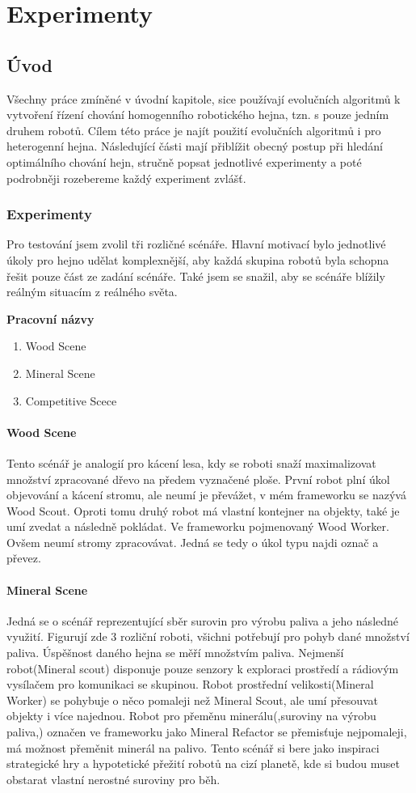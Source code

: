 \chapter{Experimenty}
\section{Úvod}
Všechny práce zmíněné v úvodní kapitole, sice používají evolučních algoritmů k vytvoření řízení chování homogenního robotického hejna, tzn. s pouze jedním druhem robotů. Cílem této práce je najít použití evolučních algoritmů i pro heterogenní hejna. Následující části mají přiblížit obecný postup při hledání optimálního chování hejn, stručně popsat jednotlivé experimenty a poté podrobněji rozebereme každý  experiment zvlášť.
\par 
\subsection{Experimenty}
Pro testování jsem zvolil tři rozličné scénáře. Hlavní motivací bylo jednotlivé úkoly pro hejno udělat komplexnější, aby každá skupina robotů byla schopna řešit pouze část ze zadání scénáře. Také jsem se snažil, aby se scénáře blížily reálným situacím z reálného světa.\par 
\textbf{Pracovní názvy}
\begin{enumerate}
	\item Wood Scene
	\item Mineral Scene
	\item Competitive Scece
\end{enumerate}
\subsubsection{Wood Scene}
Tento scénář je analogií pro kácení lesa, kdy se roboti snaží maximalizovat množství zpracované dřevo na předem vyznačené ploše. První robot plní úkol objevování a kácení stromu, ale neumí je převážet, v mém frameworku se nazývá Wood Scout. Oproti tomu druhý robot má vlastní kontejner na objekty, také je umí zvedat a následně pokládat. Ve frameworku pojmenovaný Wood Worker. Ovšem neumí stromy zpracovávat. Jedná se tedy o úkol typu najdi označ a převez.

\subsubsection{Mineral Scene}
Jedná se o scénář reprezentující sběr surovin pro výrobu paliva a jeho následné využití. Figurují zde 3 rozliční roboti, všichni potřebují pro pohyb  dané množství paliva. Úspěšnost daného hejna se měří množstvím paliva. Nejmenší robot(Mineral scout) disponuje pouze senzory k exploraci prostředí a rádiovým vysílačem pro komunikaci se skupinou. Robot prostřední velikosti(Mineral Worker) se pohybuje o něco pomaleji než Mineral Scout, ale umí přesouvat objekty i více najednou. Robot pro přeměnu minerálu(,suroviny na výrobu paliva,) označen ve frameworku jako Mineral Refactor se přemisťuje nejpomaleji, má možnost přeměnit minerál na palivo. Tento scénář si bere jako inspiraci strategické hry a hypotetické přežití robotů na cizí planetě, kde si budou muset obstarat vlastní 
nerostné suroviny pro běh.


